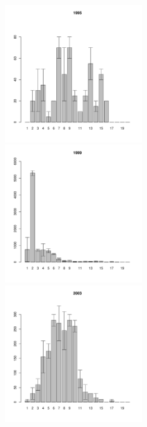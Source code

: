 \documentclass[12pt, a4paper]{article}
\begin{document}
\begin{figure}[h]
\begin{multicols}{3}
\hfill
\includegraphics[width=60mm]{../White_Sea/Ryashkov_ZRS/zrs_1995_.pdf}
\hfill
\includegraphics[width=60mm]{../White_Sea/Ryashkov_ZRS/zrs_1999_.pdf}
\hfill
\includegraphics[width=60mm]{../White_Sea/Ryashkov_ZRS/zrs_2003_.pdf}
\end{multicols}



\end{figure}
\end{document}
